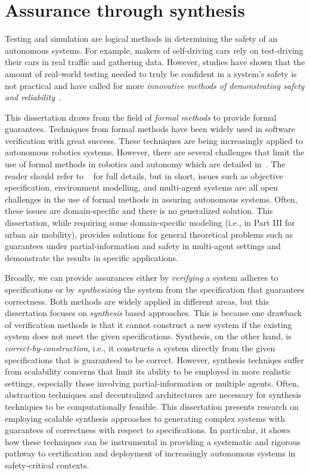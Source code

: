 \section{Assurance through synthesis}

Testing and simulation are logical methods in determining the safety of an autonomous systems. For example, makers of self-driving cars rely on test-driving their cars in real traffic and gathering data. However, studies have shown that the amount of real-world testing needed to truly be confident in a system's safety is not practical and have called for more \emph{innovative methods of demonstrating safety and reliability}~\cite{KALRA2016182}. 

This dissertation draws from the field of \emph{formal methods} to provide formal guarantees. Techniques from formal methods have been widely used in software verification with great success. These techniques are being increasingly applied to autonomous robotics systems. However, there are several challenges that limit the use of formal methods in robotics and autonomy which are detailed in~\cite{10.1145/3342355}. The reader should refer to ~\cite{10.1145/3342355} for full details, but in short, issues such as objective specification, environment modelling, and multi-agent systems are all open challenges in the use of formal methods in assuring autonomous systems. Often, these issues are domain-specific and there is no generalized solution. This dissertation, while requiring some domain-specific modeling (i.e., in Part III for urban air mobility), provides solutions for general theoretical problems such as guarantees under partial-information and safety in multi-agent settings and demonstrate the results in specific applications. 

Broadly, we can provide assurances either by \emph{verifying} a system adheres to specifications or by \emph{synthesizing} the system from the specification that guarantees correctness. Both methods are widely applied in different areas, but this dissertation focuses on \emph{synthesis} based approaches. This is because one drawback of verification methods is that it cannot construct a new system if the existing system does not meet the given specifications. Synthesis, on the other hand, is \emph{correct-by-construction}, i.e., it constructs a system directly from the given specifications that is guaranteed to be correct. However, synthesis techniqes suffer from scalability concerns that limit its ability to be employed in more realistic settings, especially those involving partial-information or multiple agents. Often, abstraction techniques and decentralized architectures are necessary for synthesis techniques to be computationally feasible. This dissertation presents research on employing scalable synthesis approaches to generating complex systems with guarantees of correctness with respect to specifications. In particular, it shows how these techniques can be instrumental in providing a systematic and rigorous pathway to certification and deployment of increasingly autonomous systems in safety-critical contexts.  


